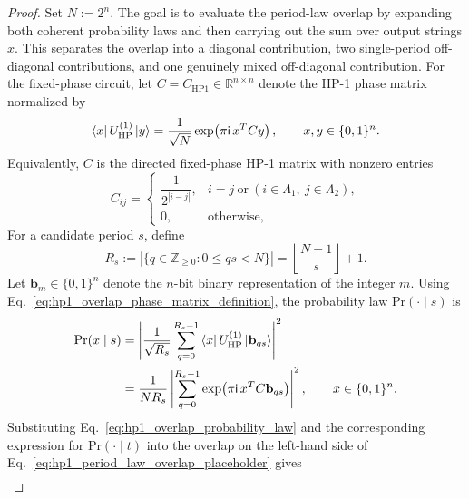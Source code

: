 \begin{proof}
Set \(N:=2^n\).
The goal is to evaluate the period-law overlap by expanding both coherent
probability laws and then carrying out the sum over output strings \(x\).
This separates the overlap into a diagonal contribution, two single-period
off-diagonal contributions, and one genuinely mixed off-diagonal contribution.
For the fixed-phase  circuit, let
\(C=C_{\mathrm{HP1}}\in\mathbb R^{n\times n}\) denote the HP-1 phase matrix
normalized by
\begin{equation}
    \bra{x}U_{\mathrm{HP}}^{(1)}\ket{y}
    =
    \frac{1}{\sqrt N}
    \exp\!\left(\pi\mathsf{i}\,x^T C y\right),
    \qquad x,y\in\{0,1\}^n .
    \label{eq:hp1_overlap_phase_matrix_definition}
\end{equation}
Equivalently, \(C\) is the directed fixed-phase HP-1 matrix with nonzero
entries
\begin{equation}
    C_{ij}
    =
    \begin{cases}
        \dfrac{1}{2^{|i-j|}},
        & i=j\ \text{or}\ (i\in\Lambda_1,\ j\in\Lambda_2),\\[1mm]
        0, & \text{otherwise},
    \end{cases}
    \label{eq:hp1_overlap_phase_matrix_entries}
\end{equation}
For a candidate period \(s\), define
\begin{equation}
    R_s
    :=
    \left|\{q\in\mathbb Z_{\ge0}:0\le qs<N\}\right|
    =
    \left\lfloor\frac{N-1}{s}\right\rfloor+1 .
    \label{eq:hp1_overlap_period_count}
\end{equation}
Let \(\mathbf b_m\in\{0,1\}^n\) denote the \(n\)-bit binary representation of
the integer \(m\).  Using Eq.~\eqref{eq:hp1_overlap_phase_matrix_definition},
the probability law \(\mathrm{Pr}(\cdot\mid s)\) is
\begin{align}
    \mathrm{Pr}(x\mid s)
    &=
    \left|
        \frac{1}{\sqrt{R_s}}
        \sum_{q=0}^{R_s-1}
        \bra{x}U_{\mathrm{HP}}^{(1)}\ket{\mathbf b_{qs}}
    \right|^2 \nonumber\\
    &=
    \frac{1}{NR_s}
    \left|
        \sum_{q=0}^{R_s-1}
        \exp\!\left(\pi\mathsf{i}\,x^T C\mathbf b_{qs}\right)
    \right|^2,
    \qquad x\in\{0,1\}^n .
    \label{eq:hp1_overlap_probability_law}
\end{align}
Substituting Eq.~\eqref{eq:hp1_overlap_probability_law} and the corresponding
expression for \(\mathrm{Pr}(\cdot\mid t)\) into the overlap on the left-hand side of
Eq.~\eqref{eq:hp1_period_law_overlap_placeholder} gives
	\begin{align}

\end{align}
\end{proof}
